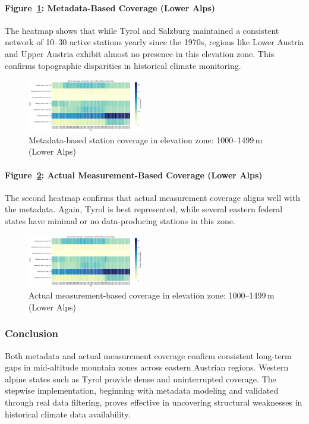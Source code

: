 \paragraph{Figure~\ref{fig:coverage_meta_loweralps}: Metadata-Based Coverage (Lower Alps)}  
The heatmap shows that while Tyrol and Salzburg maintained a consistent network of 10--30 active stations yearly since the 1970s, regions like Lower Austria and Upper Austria exhibit almost no presence in this elevation zone. This confirms topographic disparities in historical climate monitoring.

\begin{figure}[ht]
  \centering
    \includegraphics[width=0.45\textwidth]{img/coverage_zone_loweralps_meta.png}
    \caption{Metadata-based station coverage in elevation zone: 1000--1499\,m (Lower Alps)}
    \label{fig:coverage_meta_loweralps}
\end{figure}

\paragraph{Figure~\ref{fig:coverage_real_loweralps}: Actual Measurement-Based Coverage (Lower Alps)}  
The second heatmap confirms that actual measurement coverage aligns well with the metadata. Again, Tyrol is best represented, while several eastern federal states have minimal or no data-producing stations in this zone.

\begin{figure}[ht]
  \centering
    \includegraphics[width=0.45\textwidth]{img/data_coverage_loweralps.png}
    \caption{Actual measurement-based coverage in elevation zone: 1000--1499\,m (Lower Alps)}
    \label{fig:coverage_real_loweralps}
\end{figure}

\subsubsection{Conclusion}
Both metadata and actual measurement coverage confirm consistent long-term gaps in mid-altitude mountain zones across eastern Austrian regions. Western alpine states such as Tyrol provide dense and uninterrupted coverage. The stepwise implementation, beginning with metadata modeling and validated through real data filtering, proves effective in uncovering structural weaknesses in historical climate data availability.
